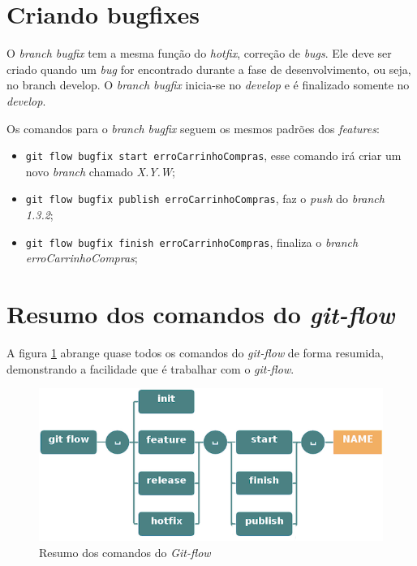 \documentclass[12pt,openright,oneside,a4paper,english,brazil]{abntex2}
\begin{document}
\section{Criando bugfixes}

O \textit{branch bugfix} tem a mesma função do \textit{hotfix}, correção de \textit{bugs}. Ele deve ser criado quando um \textit{bug} for encontrado durante a fase de desenvolvimento, ou seja, no branch develop. O \textit{branch bugfix} inicia-se no \textit{develop} e é finalizado somente no \textit{develop}.

Os comandos para o \textit{branch bugfix} seguem os mesmos padrões dos \textit{features}:

\begin{itemize}
	\item \verb|git flow bugfix start erroCarrinhoCompras|, esse comando irá criar um novo \textit{branch} chamado \textit{X.Y.W};
	\item \verb|git flow bugfix publish erroCarrinhoCompras|, faz o \textit{push} do \textit{branch 1.3.2};
	\item \verb|git flow bugfix finish erroCarrinhoCompras|, finaliza o \textit{branch erroCarrinhoCompras};
\end{itemize}

\section{Resumo dos comandos do \textit{git-flow}}

A figura \ref{comandos} abrange quase todos os comandos do \textit{git-flow} de forma resumida, demonstrando a facilidade que é trabalhar com o \textit{git-flow}.

\begin{figure}[htb]
	\caption{\label{comandos}Resumo dos comandos do \textit{Git-flow}}
	\begin{center}
		\includegraphics[width=1\linewidth]{imagens/comandos}
	\end{center}
\end{figure}
\end{document}
